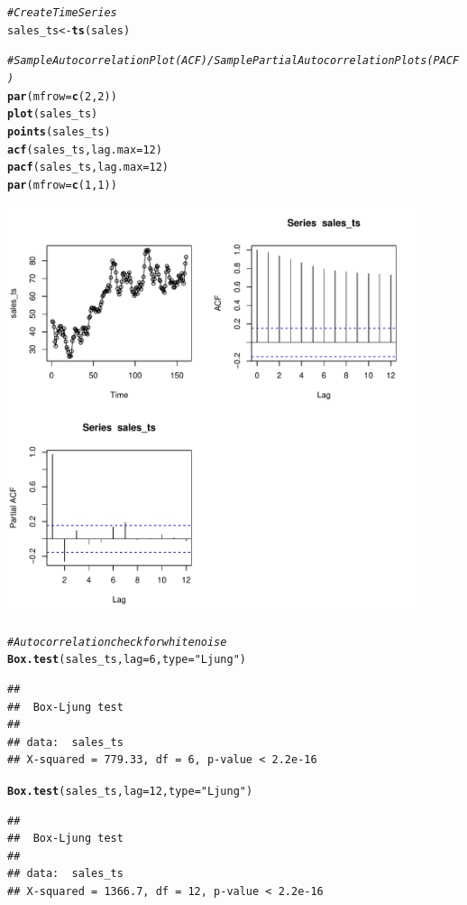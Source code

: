 \documentclass{article}\usepackage[]{graphicx}\usepackage[]{color}
\makeatletter
\newcommand{\hlnum}[1]{\textcolor[rgb]{0.686,0.059,0.569}{#1}}%
\newcommand{\hlstr}[1]{\textcolor[rgb]{0.192,0.494,0.8}{#1}}%
\newcommand{\hlcom}[1]{\textcolor[rgb]{0.678,0.584,0.686}{\textit{#1}}}%
\newcommand{\hlstd}[1]{\textcolor[rgb]{0.345,0.345,0.345}{#1}}%
\newcommand{\hlkwb}[1]{\textcolor[rgb]{0.69,0.353,0.396}{#1}}%
\newcommand{\hlkwc}[1]{\textcolor[rgb]{0.333,0.667,0.333}{#1}}%
\newcommand{\hlkwd}[1]{\textcolor[rgb]{0.737,0.353,0.396}{\textbf{#1}}}%
\newenvironment{kframe}{%
 \def\at@end@of@kframe{}%
 \ifinner\ifhmode%
  \def\at@end@of@kframe{\end{minipage}}%
  \begin{minipage}{\columnwidth}%
 \fi\fi%
 \def\FrameCommand##1{\hskip\@totalleftmargin \hskip-\fboxsep
 \colorbox{shadecolor}{##1}\hskip-\fboxsep
     \hskip-\linewidth \hskip-\@totalleftmargin \hskip\columnwidth}%
 \MakeFramed {\advance\hsize-\width
   \@totalleftmargin\z@ \linewidth\hsize
   \@setminipage}}%
 {\par\unskip\endMakeFramed%
 \at@end@of@kframe}
\newenvironment{knitrout}{}{} %
\makeatother
\begin{document}
\begin{knitrout}
\color{fgcolor}\begin{kframe}
\begin{alltt}
\hlcom{# Create Time Series }
\hlstd{sales_ts} \hlkwb{<-} \hlkwd{ts}\hlstd{(sales)}

\hlcom{# Sample Autocorrelation Plot (ACF) / Sample Partial Autocorrelation Plots (PACF)}
\hlkwd{par}\hlstd{(}\hlkwc{mfrow} \hlstd{=} \hlkwd{c}\hlstd{(}\hlnum{2}\hlstd{,} \hlnum{2}\hlstd{))}
\hlkwd{plot}\hlstd{(sales_ts)}
\hlkwd{points}\hlstd{(sales_ts)}
\hlkwd{acf}\hlstd{(sales_ts,} \hlkwc{lag.max} \hlstd{=} \hlnum{12}\hlstd{)}
\hlkwd{pacf}\hlstd{(sales_ts,} \hlkwc{lag.max} \hlstd{=} \hlnum{12}\hlstd{)}
\hlkwd{par}\hlstd{(}\hlkwc{mfrow} \hlstd{=} \hlkwd{c}\hlstd{(}\hlnum{1}\hlstd{,} \hlnum{1}\hlstd{))}
\end{alltt}
\end{kframe}

{\centering \includegraphics[width=0.9\textwidth]{figure/unnamed-chunk-2-1} 

}


\begin{kframe}\begin{alltt}
\hlcom{# Autocorrelation check for white noise}
\hlkwd{Box.test}\hlstd{(sales_ts,} \hlkwc{lag} \hlstd{=} \hlnum{6}\hlstd{,} \hlkwc{type} \hlstd{=} \hlstr{"Ljung"}\hlstd{)}
\end{alltt}
\begin{verbatim}
## 
## 	Box-Ljung test
## 
## data:  sales_ts
## X-squared = 779.33, df = 6, p-value < 2.2e-16
\end{verbatim}
\begin{alltt}
\hlkwd{Box.test}\hlstd{(sales_ts,} \hlkwc{lag} \hlstd{=} \hlnum{12}\hlstd{,} \hlkwc{type} \hlstd{=} \hlstr{"Ljung"}\hlstd{)}
\end{alltt}
\begin{verbatim}
## 
## 	Box-Ljung test
## 
## data:  sales_ts
## X-squared = 1366.7, df = 12, p-value < 2.2e-16
\end{verbatim}
\end{kframe}
\end{knitrout}
\end{document}
